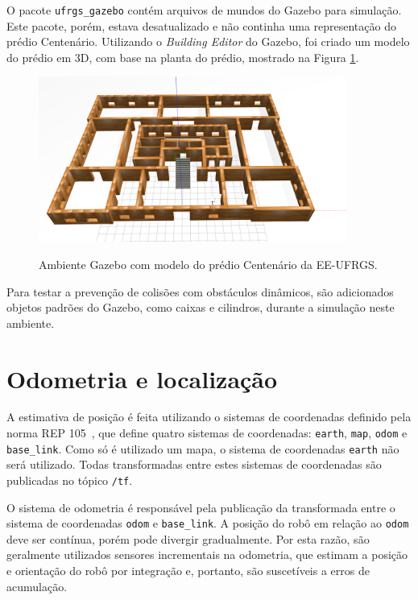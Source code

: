 \documentclass[repeatfields,xlists,xpacks,oneside,yearsonly]{ufrgscca}
\begin{document}
O pacote \texttt{ufrgs\_gazebo} contém arquivos de mundos do Gazebo
para simulação. Este pacote, porém, estava desatualizado e não
continha uma representação do prédio Centenário. Utilizando o
\textit{Building Editor} do Gazebo, foi criado um modelo do prédio em
3D, com base na planta do prédio, mostrado na Figura
\ref{fig:gazebo_centenario}. 

\begin{figure}[h]
    {
        \centering
        \caption{Ambiente Gazebo com modelo do prédio Centenário da EE-UFRGS.}
        \label{fig:gazebo_centenario}
        \includegraphics[width=0.9\textwidth]{gazebo.png}\\
    }
\end{figure}

Para testar a prevenção de colisões com obstáculos dinâmicos, são
adicionados objetos padrões do Gazebo, como caixas e cilindros,
durante a simulação neste ambiente.

\section{Odometria e localização}

A estimativa de posição é feita utilizando o sistemas de coordenadas
definido pela norma REP 105~\cite{rep_105}, que define quatro
sistemas de coordenadas: \texttt{earth}, \texttt{map}, \texttt{odom}
e \texttt{base\_link}. Como só é utilizado um mapa, o sistema de
coordenadas \texttt{earth} não será utilizado. Todas transformadas
entre estes sistemas de coordenadas são publicadas no tópico
\texttt{/tf}.

O sistema de odometria é responsável pela publicação da transformada
entre o sistema de coordenadas \texttt{odom} e \texttt{base\_link}. A
posição do robô em relação ao \texttt{odom} deve ser contínua, porém
pode divergir gradualmente. Por esta razão, são geralmente utilizados
sensores incrementais na odometria, que estimam a posição e
orientação do robô por integração e, portanto, são suscetíveis a
erros de acumulação.
\end{document}
